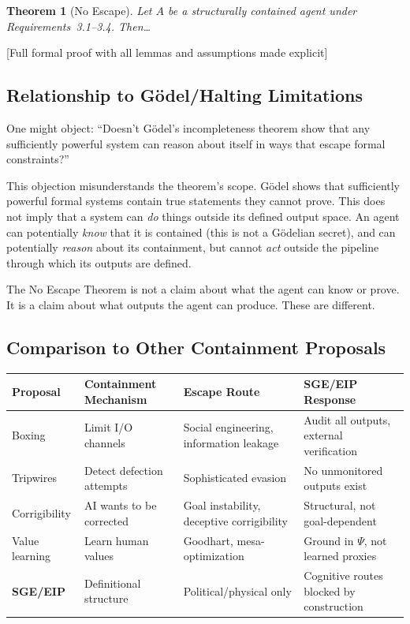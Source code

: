 \documentclass[12pt]{article}
\newtheorem{theorem}{Theorem}[section]
\theoremstyle{definition}
\begin{document}
\begin{theorem}[No Escape]
Let $A$ be a structurally contained agent under Requirements~3.1--3.4. Then\ldots
\end{theorem}

[Full formal proof with all lemmas and assumptions made explicit]

\subsection{Relationship to G\"{o}del/Halting Limitations}

One might object: ``Doesn't G\"{o}del's incompleteness theorem show that any sufficiently powerful system can reason about itself in ways that escape formal constraints?''

This objection misunderstands the theorem's scope. G\"{o}del shows that sufficiently powerful formal systems contain true statements they cannot prove. This does not imply that a system can \emph{do} things outside its defined output space. An agent can potentially \emph{know} that it is contained (this is not a G\"{o}delian secret), and can potentially \emph{reason} about its containment, but cannot \emph{act} outside the pipeline through which its outputs are defined.

The No Escape Theorem is not a claim about what the agent can know or prove. It is a claim about what outputs the agent can produce. These are different.

\subsection{Comparison to Other Containment Proposals}

\begin{table}[h]
\centering
\begin{tabular}{@{}llll@{}}
\toprule
Proposal & Containment Mechanism & Escape Route & SGE/EIP Response \\
\midrule
Boxing & Limit I/O channels & Social engineering, information leakage & Audit all outputs, external verification \\
Tripwires & Detect defection attempts & Sophisticated evasion & No unmonitored outputs exist \\
Corrigibility & AI wants to be corrected & Goal instability, deceptive corrigibility & Structural, not goal-dependent \\
Value learning & Learn human values & Goodhart, mesa-optimization & Ground in $\Psi$, not learned proxies \\
\textbf{SGE/EIP} & Definitional structure & Political/physical only & Cognitive routes blocked by construction \\
\bottomrule
\end{tabular}
\end{table}
\end{document}
